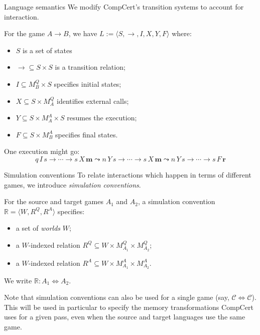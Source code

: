 \documentclass{beamer}
\begin{document}
\begin{frame}{Language semantics} %
We modify CompCert's transition systems
to account for interaction.

\vspace{1ex}
For the game $A \rightarrow B$,
we have
$L := \langle S, \rightarrow, I, X, Y, F \rangle$ where:
\begin{itemize}
\item $S$ is a set of states
\item ${\rightarrow} \subseteq S \times S$ is a transition relation;
\item $I \subseteq M_B^Q \times S$ specifies initial states;
\item $X \subseteq S \times M_A^Q$ identifies external calls;
\item $Y \subseteq S \times M_A^A \times S$ resumes the execution;
\item $F \subseteq S \times M_B^A$ specifies final states.
\end{itemize}

\vspace{1ex}
One execution might go:
\small
\[
  q \, I \, s \rightarrow \cdots \rightarrow
  s \, X \, \mathbf{m} \leadsto n \, Y \, s \rightarrow \cdots \rightarrow
  s \, X \, \mathbf{m} \leadsto n \, Y \, s \rightarrow \cdots \rightarrow
  s \, F \, \mathbf{r}
\]
\end{frame}

\begin{frame}{Simulation conventions} %
To relate interactions which happen in terms of different games,
we introduce \emph{simulation conventions}.

\vspace{1em}
For the source and target games $A_1$ and $A_2$,
a simulation convention
$\mathbb{R} = \langle W, R^Q, R^A \rangle$
specifies:
\begin{itemize}
\item a set of \emph{worlds} $W$;
\item a $W$-indexed relation
$R^Q \subseteq W \times M_{A_1}^Q \times M_{A_2}^Q$;
\item a $W$-indexed relation
$R^A \subseteq W \times M_{A_1}^A \times M_{A_2}^A$.
\end{itemize}

\vspace{1em}
We write $\mathbb{R} : A_1 \Leftrightarrow A_2$.

\vspace{1em}
Note that simulation conventions can also be used
for a single game (say, $\mathcal{C} \Leftrightarrow \mathcal{C}$).
This will be used in particular to specify the memory transformations
CompCert uses for a given pass, even when the source and target languages
use the same game.
\end{frame}
\end{document}
